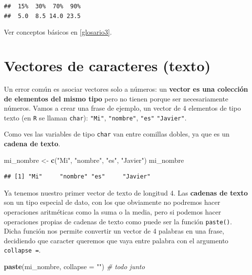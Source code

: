 \documentclass[11pt,]{book}
\newenvironment{Shaded}{\begin{snugshade}}{\end{snugshade}}
\newcommand{\CommentTok}[1]{\textcolor[rgb]{0.37,0.37,0.37}{\textit{#1}}}
\newcommand{\DataTypeTok}[1]{\textcolor[rgb]{0.27,0.27,0.27}{#1}}
\newcommand{\KeywordTok}[1]{\textcolor[rgb]{0.27,0.27,0.27}{\textbf{#1}}}
\newcommand{\NormalTok}[1]{#1}
\newcommand{\StringTok}[1]{\textcolor[rgb]{0.5,0.5,0.5}{#1}}
\begin{document}
\begin{verbatim}
##  15%  30%  70%  90% 
##  5.0  8.5 14.0 23.5
\end{verbatim}

Ver conceptos básicos en \ref{glosario3}.

\hypertarget{vectores-de-caracteres-texto}{%
\section{Vectores de caracteres (texto)}\label{vectores-de-caracteres-texto}}

Un error común es asociar vectores solo a números: un \textbf{vector es una colección de elementos del mismo tipo} pero no tienen porque ser necesariamente números. Vamos a crear una frase de ejemplo, un vector de 4 elementos de tipo texto (en \texttt{R} se llaman \texttt{char}): \texttt{"Mi"}, \texttt{"nombre"}, \texttt{"es"} \texttt{"Javier"}.

Como ves las variables de tipo \texttt{char} van entre comillas dobles, ya que es un \textbf{cadena de texto}.

\begin{Shaded}
\begin{Highlighting}[]
\NormalTok{mi_nombre <-}\StringTok{ }\KeywordTok{c}\NormalTok{(}\StringTok{"Mi"}\NormalTok{, }\StringTok{"nombre"}\NormalTok{, }\StringTok{"es"}\NormalTok{, }\StringTok{"Javier"}\NormalTok{)}
\NormalTok{mi_nombre}
\end{Highlighting}
\end{Shaded}

\begin{verbatim}
## [1] "Mi"     "nombre" "es"     "Javier"
\end{verbatim}

Ya tenemos nuestro primer vector de texto de longitud 4. Las \textbf{cadenas de texto} son un tipo especial de dato, con los que obviamente no podremos hacer operaciones aritméticas como la suma o la media, pero si podemos hacer operaciones propias de cadenas de texto como puede ser la función \texttt{paste()}. Dicha función nos permite convertir un vector de 4 palabras en una frase, decidiendo que caracter queremos que vaya entre palabra con el argumento \texttt{collapse\ =}.

\begin{Shaded}
\begin{Highlighting}[]
\KeywordTok{paste}\NormalTok{(mi_nombre, }\DataTypeTok{collapse =} \StringTok{""}\NormalTok{) }\CommentTok{# todo junto}
\end{Highlighting}
\end{Shaded}
\end{document}
